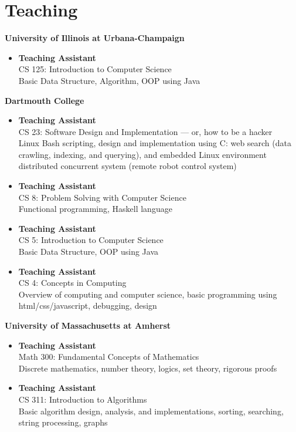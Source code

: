 \section{\sc Teaching}

{\bf University of Illinois at Urbana-Champaign}
\begin{itemize}
\item {\bf Teaching Assistant} \\ CS 125: Introduction to Computer
  Science \\ Basic Data Structure, Algorithm, OOP using Java
\end{itemize}

{\bf Dartmouth College}
\begin{itemize}
\item {\bf Teaching Assistant} \\ CS 23: Software Design and
  Implementation --– or, how to be a hacker \\ Linux Bash scripting,
  design and implementation using C: web search (data crawling,
  indexing, and querying), and embedded Linux environment distributed
  concurrent system (remote robot control system)
\item {\bf Teaching Assistant} \\ CS 8: Problem Solving with Computer
  Science \\ Functional programming, Haskell language
\item {\bf Teaching Assistant} \\ CS 5: Introduction to Computer
  Science \\ Basic Data Structure, OOP using Java
\item {\bf Teaching Assistant} \\ CS 4: Concepts in Computing
  \\ Overview of computing and computer science, basic programming
  using html/css/javascript, debugging, design
\end{itemize}

{\bf University of Massachusetts at Amherst}
\begin{itemize}
\item {\bf Teaching Assistant} \\ Math 300: Fundamental Concepts of
  Mathematics \\ Discrete mathematics, number theory, logics, set
  theory, rigorous proofs
\item {\bf Teaching Assistant} \\ CS 311: Introduction to Algorithms \\ Basic
  algorithm design, analysis, and implementations, sorting, searching,
  string processing, graphs
\end{itemize}
